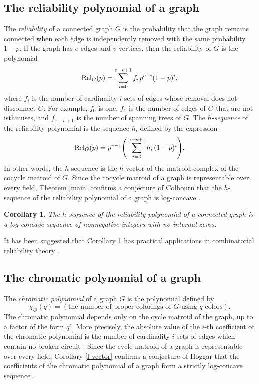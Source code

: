 \documentclass{compositio}
\newtheorem{corollary}[theorem]{Corollary}
\theoremstyle{definition}
\theoremstyle{remark}
\begin{document}
\subsection{The reliability polynomial of a graph}

The \emph{reliability} of a connected graph $G$ is the probability that the graph remains connected when each edge is independently removed with the same probability $1-p$. If the graph has $e$ edges and $v$ vertices, then the reliability of $G$ is the polynomial
\[
\text{Rel}_G(p) = \sum_{i=0}^{e-v+1} f_i \hspace{0.5mm} p^{e-i}(1-p)^i,
\]
where $f_i$ is the number of cardinality $i$ sets of edges whose removal does not disconnect $G$. For example, $f_0$ is one, $f_1$ is the number of edges of $G$ that are not isthmuses, and $f_{e-v+1}$ is the number of spanning trees of $G$. The \emph{$h$-sequence} of the reliability polynomial is the sequence $h_i$ defined by the expression
\[
\text{Rel}_G(p) = p^{v-1} \Bigg(\sum_{i=0}^{e-v+1} h_i \hspace{0.5mm} (1-p)^i\Bigg).
\] 
In other words, the $h$-sequence is the $h$-vector of the matroid complex of the cocycle matroid of $G$.
Since the cocycle matroid of a graph is representable over every field, Theorem \ref{main} confirms a conjecture of Colbourn
that the $h$-sequence of the reliability polynomial of a graph is log-concave \cite{Colbourn}.

\begin{corollary}\label{Colbourn's conjecture}
The $h$-sequence of the reliability polynomial of a connected graph is a log-concave sequence of nonnegative integers with no internal zeros.
\end{corollary}

It has been suggested that Corollary \ref{Colbourn's conjecture} has practical applications in combinatorial reliability theory \cite{Brown-Colbourn}.

\subsection{The chromatic polynomial of a graph}

The \emph{chromatic polynomial} of a graph $G$ is the polynomial defined by
\[
\chi_G(q) = (\text{the number of proper colorings of $G$ using $q$ colors}). 
\]
The chromatic polynomial depends only on the cycle matroid of the graph, up to a factor of the form $q^c$. More precisely, the absolute value of the $i$-th coefficient of the chromatic polynomial is the number of cardinality $i$ sets of edges which contain no broken circuit \cite{Whitney}.
Since the cycle matroid of a graph is representable over every field, Corollary \ref{f-vector} confirms a conjecture of Hoggar that the coefficients of the chromatic polynomial of a graph form a strictly log-concave sequence \cite{Hoggar}. 
 
\end{document}
